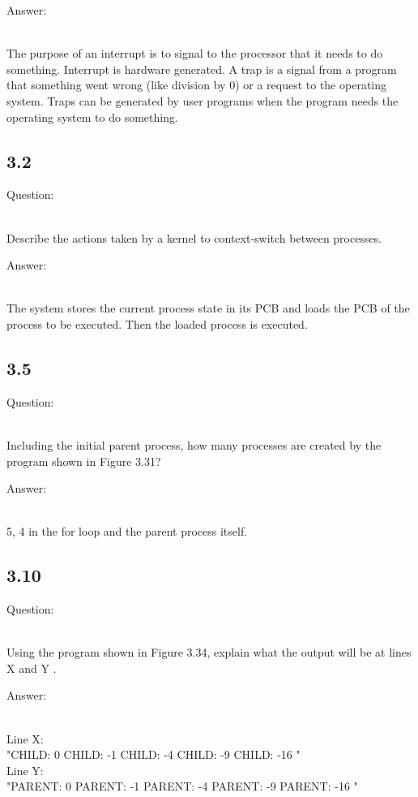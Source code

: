 \documentclass[]{article}
\begin{document}
\begin{bfseries} Answer: \end{bfseries}\\
The purpose of an interrupt is to signal to the processor that it needs to do something. Interrupt is hardware generated. A trap is a signal from a program that something went wrong (like division by 0) or a request to the operating system. Traps can be generated by user programs when the program needs the operating system to do something.

\subsection*{3.2}
\begin{bfseries} Question: \end{bfseries}\\
Describe the actions taken by a kernel to context-switch between processes.\\
\begin{bfseries} Answer: \end{bfseries}\\
The system stores the current process state in its PCB and loads the PCB of the process to be executed. Then the loaded process is executed.\\

\subsection*{3.5}
\begin{bfseries} Question: \end{bfseries}\\
Including the initial parent process, how many processes are created by the program shown in Figure 3.31?\\
\begin{bfseries} Answer: \end{bfseries}\\
5, 4 in the for loop and the parent process itself.\\

\subsection*{3.10}
\begin{bfseries} Question: \end{bfseries}\\
Using the program shown in Figure 3.34, explain what the output will be at lines X and Y .\\
\begin{bfseries} Answer: \end{bfseries}\\
Line X:\\
"CHILD: 0 CHILD: -1 CHILD: -4 CHILD: -9 CHILD: -16 "\\
Line Y:\\
"PARENT: 0 PARENT: -1 PARENT: -4 PARENT: -9 PARENT: -16 "\\
\end{document}
